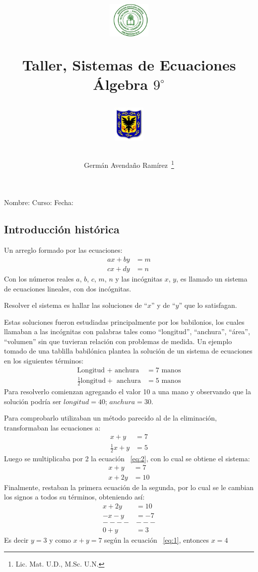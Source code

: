 \documentclass[letterpaper,11pt]{article}
\author{Germ\'an Avenda\~no Ram\'irez~\thanks{Lic. Mat. U.D., M.Sc. U.N.}}
\title{\begin{minipage}{.2\textwidth}
\includegraphics[height=1.75cm]{Images/logo-colegio.png}\end{minipage}
\begin{minipage}{.55\textwidth}
\begin{center}
Taller, Sistemas de Ecuaciones \\
Álgebra $9^{\circ}$
\end{center}
\end{minipage}\hfill
\begin{minipage}{.2\textwidth}
\includegraphics[height=1.75cm]{Images/logo-sed.png} 
\end{minipage}}
\date{}
\begin{document}
\maketitle
Nombre: \hrulefill Curso: \underline{\hspace*{44pt}} Fecha: \underline{\hspace*{2.5cm}}
\begin{multicols}{2}
\section*{Introducci\'on hist\'orica}
Un arreglo formado por las ecuaciones:
\begin{align*}
ax+by&=m\\
cx+dy&=n
\end{align*}
Con los números reales $a$, $b$, $c$, $m$, $n$ y las incógnitas $x$, $y$, es llamado un sistema de ecuaciones lineales, con dos incógnitas.

Resolver el sistema es hallar las soluciones de “$x$” y de “$y$” que lo satisfagan.

Estas soluciones fueron estudiadas principalmente por los babilonios, los cuales llamaban a las incógnitas con palabras tales como “longitud”, “anchura”, “área”, “volumen” sin que tuvieran relación con problemas de medida. Un ejemplo tomado de una tablilla babilónica plantea la solución de un sistema de ecuaciones en los siguientes términos:
\begin{align*}
\text{Longitud }+\text{ anchura}&=7 \text{ manos}\\
\frac{1}{2}\text{longitud}+\text{ anchura}&=5\text{ manos}  
\end{align*}
Para resolverlo comienzan agregando el valor 10 a una mano y observando que la solución podría ser $longitud = 40$; $anchura = 30$.

Para comprobarlo utilizaban un método parecido al de la eliminación, transformaban las ecuaciones a:
\begin{align}
x+y&=7\label{eq:1}\\
\frac{1}{2}x+y&=5\label{eq:2}
\end{align}
Luego se multiplicaba por 2 la ecuaci\'on ~\ref{eq:2}, con lo cual se obtiene el sistema:
\begin{align*}
x+y&=7\\
x+2y&=10
\end{align*}
Finalmente, restaban la primera ecuaci\'on de la segunda, por lo cual se le cambian los signos a todos su términos, obteniendo así:
\begin{align*}
x+2y&=10\\
-x-y&=-7\\
----&---\\
0+y&=3
\end{align*}
Es decir $y=3$ y como $x+y=7$ según la ecuaci\'on ~\ref{eq:1}, entonces $x=4$


\end{multicols}
\end{document}
